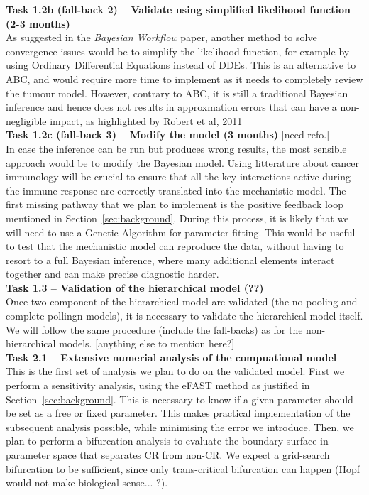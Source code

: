 \documentclass[11pt]{article}
\begin{document}
%
\noindent\textbf{Task 1.2b (fall-back 2) -- Validate using simplified likelihood function (2-3 months)}\\
As suggested in the \textit{Bayesian Workflow} paper, another method to solve convergence issues would be to simplify the likelihood function, for example by using Ordinary Differential Equations instead of DDEs. This is an alternative to ABC, and would require more time to implement as it needs to completely review the tumour model. However, contrary to ABC, it is still a traditional Bayesian inference and hence does not results in approxmation errors that can have a non-negligible impact, as highlighted by Robert et al, 2011 \cite{ABCerror}\\[12pt] 
%
\noindent\textbf{Task 1.2c (fall-back 3) -- Modify the model (3 months)} [need refo.]\\ 
In case the inference can be run but produces wrong results, the most sensible approach would be to modify the Bayesian model. Using litterature about cancer immunology will be crucial to ensure that all the key interactions active during the immune response are correctly translated into the mechanistic model. The first missing pathway that we plan to implement is the positive feedback loop mentioned in Section~\ref{sec:background}.  During this process, it is likely that we will need to use a Genetic Algorithm for parameter fitting. This would be useful to test that the mechanistic model can reproduce the data, without having to resort to a full Bayesian inference, where many additional elements interact together and can make precise diagnostic harder. \\[12pt] 
%
\noindent\textbf{Task 1.3 -- Validation of the hierarchical model (??)}\\ 
Once two component of the hierarchical model are validated (the no-pooling and complete-pollingn models), it is necessary to validate the hierarchical model itself. We will follow the same procedure (include the fall-backs) as for the non-hierarchical models. [anything else to mention here?]\\[12pt]
%
\noindent\textbf{Task 2.1 -- Extensive numerial analysis of the compuational model}\\ 
This is the first set of analysis we plan to do on the validated model. First we perform a sensitivity analysis, using the eFAST method as justified in Section~\ref{sec:background}. This is necessary to know if a given parameter should be set as a free or fixed parameter. This makes practical implementation of the subsequent analysis possible, while minimising the error we introduce. Then, we plan to perform a bifurcation analysis to evaluate the boundary surface in parameter space that separates CR from non-CR. We expect a grid-search bifurcation to be sufficient, since only trans-critical bifurcation can happen (Hopf would not make biological sense... ?). \\[12pt]
\end{document}
